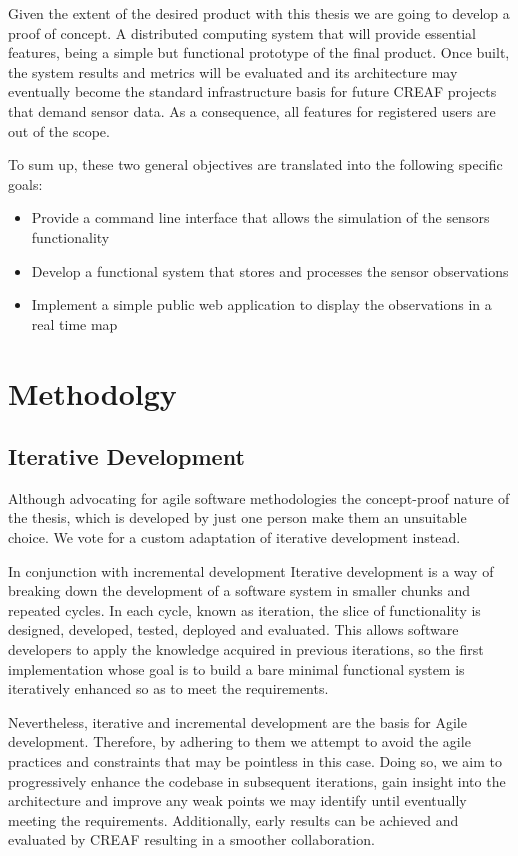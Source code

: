 Given the extent of the desired product with this thesis we are going to develop a proof of concept. A distributed computing system that will provide essential features, being a simple but functional prototype of the final product. Once built, the system results and metrics will be evaluated and its architecture may eventually become the standard infrastructure basis for future CREAF projects that demand sensor data. As a consequence, all features for registered users are out of the scope.

To sum up, these two general objectives are translated into the following specific goals:

\begin{itemize}
	\item Provide a command line interface that allows the simulation of the sensors functionality
	\item Develop a functional system that stores and processes the sensor observations
	\item Implement a simple public web application to display the observations in a real time map
\end{itemize}

\section{Methodolgy}

\subsection{Iterative Development}

Although advocating for agile software methodologies the concept-proof nature of the thesis, which is developed by just one person make them an unsuitable choice. We vote for a custom adaptation of iterative development instead.

In conjunction with incremental development Iterative development is a way of breaking down the development of a software system in smaller chunks and repeated cycles. In each cycle, known as iteration, the slice of functionality is designed, developed, tested, deployed and evaluated. This allows software developers to apply the knowledge acquired in previous iterations, so the first implementation whose goal is to build a bare minimal functional system is iteratively enhanced so as to meet the requirements.

Nevertheless, iterative and incremental development are the basis for Agile development. Therefore, by adhering to them we attempt to avoid the agile practices and constraints that may be pointless in this case. Doing so, we aim to progressively enhance the codebase in subsequent iterations, gain insight into the architecture and improve any weak points we may identify until eventually meeting the requirements. Additionally, early results can be achieved and evaluated by CREAF resulting in a smoother collaboration.

